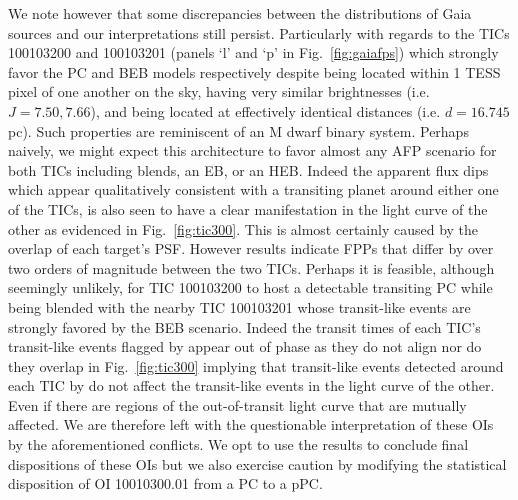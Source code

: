 We note however that some discrepancies between the distributions of Gaia sources and our \vespa{}
interpretations still persist. Particularly with regards to the TICs 100103200 and 100103201 (panels `l'
and `p' in Fig.~\ref{fig:gaiafps}) which strongly favor the PC and BEB models respectively despite being
located within 1 TESS pixel of one another on the sky, having very
similar brightnesses (i.e. $J=7.50, 7.66$), and being located at effectively identical distances (i.e.
$d=16.745$ pc). Such properties are reminiscent of an M dwarf binary system.
Perhaps naively, we might expect this architecture to favor almost any AFP scenario for
both TICs including blends, an EB, or an HEB. Indeed the apparent flux dips which appear qualitatively
consistent with a transiting planet around either one of the TICs, is also seen to have a clear manifestation
in the light curve of the other as evidenced in Fig.~\ref{fig:tic300}. This is almost certainly caused by the
overlap of each target's PSF.
However \vespa{} results indicate FPPs that differ by over two orders of magnitude between the two TICs.
Perhaps it is feasible, although seemingly unlikely, for TIC 100103200 to host a detectable transiting
PC while being blended with the nearby TIC 100103201 whose transit-like events are strongly favored by the
BEB scenario. Indeed the transit times of each TIC's transit-like events flagged by \pipeline{} appear out of
phase as they do not align nor do they overlap in Fig.~\ref{fig:tic300} implying that transit-like events detected
around each TIC by \pipeline{} do not affect the transit-like events in the light curve of the other. Even if
there are regions of the out-of-transit light curve that are mutually affected.
We are therefore left with the questionable interpretation
of these OIs by the aforementioned conflicts. We opt to use the \vespa{} results to conclude final
dispositions of these OIs but we also exercise caution by modifying the statistical disposition of
OI 10010300.01 from a PC to a pPC.

